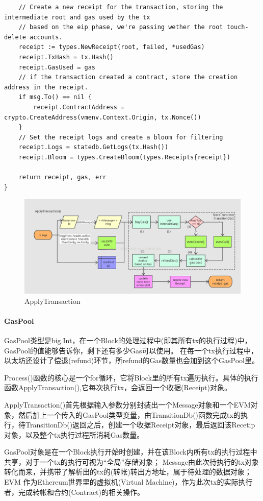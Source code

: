 \documentclass[UTF8]{ctexart}
\begin{document}
\begin{lstlisting}
	// Create a new receipt for the transaction, storing the intermediate root and gas used by the tx
	// based on the eip phase, we're passing wether the root touch-delete accounts.
	receipt := types.NewReceipt(root, failed, *usedGas)
	receipt.TxHash = tx.Hash()
	receipt.GasUsed = gas
	// if the transaction created a contract, store the creation address in the receipt.
	if msg.To() == nil {
		receipt.ContractAddress = crypto.CreateAddress(vmenv.Context.Origin, tx.Nonce())
	}
	// Set the receipt logs and create a bloom for filtering
	receipt.Logs = statedb.GetLogs(tx.Hash())
	receipt.Bloom = types.CreateBloom(types.Receipts{receipt})

	return receipt, gas, err
}
\end{lstlisting}

\begin{figure}
	\centering
	\includegraphics[scale=0.3]{applyTransaction.png}
	\caption{ApplyTransaction}
	\label{applyTransaction}
\end{figure}

\paragraph{GasPool}
GasPool类型是big.Int，在一个Block的处理过程中(即其所有tx的执行过程)中，GasPool的值能够告诉你，剩下还有多少Gas可以使用。
在每一个tx执行过程中，以太坊还设计了偿退(refund)环节，所refund的Gas数量也会加到这个GasPool里。

Process()函数的核心是一个for循环，它将Block里的所有tx遍历执行。具体的执行函数ApplyTransaction(),它每次执行tx，会返回一个收据(Receipt)对象。

ApplyTransaction()首先根据输入参数分别封装出一个Message对象和一个EVM对象，然后加上一个传入的GasPool类型变量，由TransitionDb()函数完成tx的执行，待TransitionDb()返回之后，创建一个收据Receipt对象，最后返回该Recetip对象，以及整个tx执行过程所消耗Gas数量。

GasPool对象是在一个Block执行开始时创建，并在该Block内所有tx的执行过程中共享，对于一个tx的执行可视为“全局”存储对象； Message由此次待执行的tx对象转化而来，并携带了解析出的tx的(转帐)转出方地址，属于待处理的数据对象；EVM 作为Ethereum世界里的虚拟机(Virtual Machine)，作为此次tx的实际执行者，完成转帐和合约(Contract)的相关操作。
\end{document}
